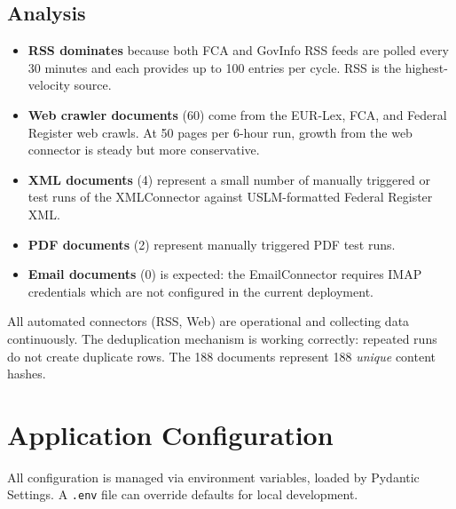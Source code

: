 \documentclass[12pt,a4paper]{article}
\begin{document}
\subsection{Analysis}

\begin{itemize}[noitemsep]
  \item \textbf{RSS dominates} because both FCA and GovInfo RSS feeds are polled every 30 minutes and each provides up to 100 entries per cycle. RSS is the highest-velocity source.
  \item \textbf{Web crawler documents} (60) come from the EUR-Lex, FCA, and Federal Register web crawls. At 50 pages per 6-hour run, growth from the web connector is steady but more conservative.
  \item \textbf{XML documents} (4) represent a small number of manually triggered or test runs of the XMLConnector against USLM-formatted Federal Register XML.
  \item \textbf{PDF documents} (2) represent manually triggered PDF test runs.
  \item \textbf{Email documents} (0) is expected: the EmailConnector requires IMAP credentials which are not configured in the current deployment.
\end{itemize}

\begin{successbox}
All automated connectors (RSS, Web) are operational and collecting data continuously. The deduplication mechanism is working correctly: repeated runs do not create duplicate rows. The 188 documents represent 188 \emph{unique} content hashes.
\end{successbox}

\section{Application Configuration}

All configuration is managed via environment variables, loaded by Pydantic Settings. A \texttt{.env} file can override defaults for local development.
\end{document}
